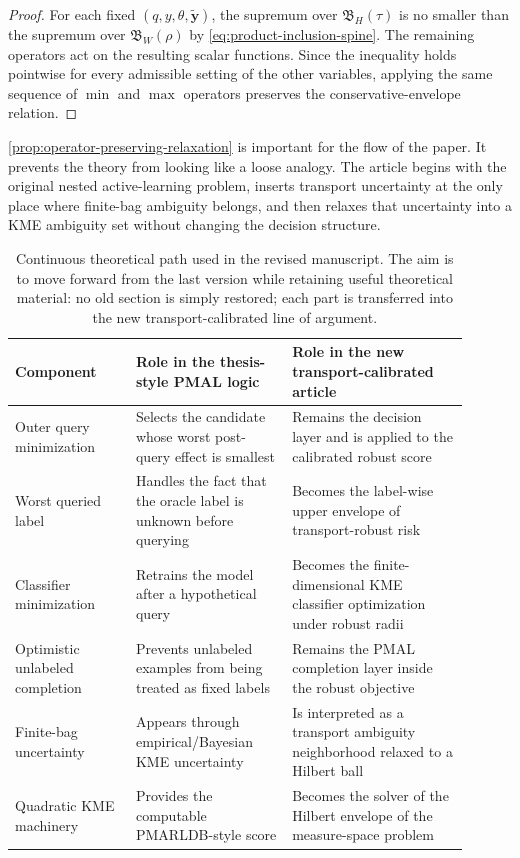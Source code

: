 \documentclass[10pt,journal]{IEEEtran}
\begin{document}
\begin{proof}
For each fixed $(q,y,\theta,\tilde{\mathbf y})$, the supremum over $\mathfrak B_H(\tau)$ is no smaller than the supremum over $\mathfrak B_W(\rho)$ by \eqref{eq:product-inclusion-spine}. The remaining operators act on the resulting scalar functions. Since the inequality holds pointwise for every admissible setting of the other variables, applying the same sequence of $\min$ and $\max$ operators preserves the conservative-envelope relation.
\end{proof}

\cref{prop:operator-preserving-relaxation} is important for the flow of the paper. It prevents the theory from looking like a loose analogy. The article begins with the original nested active-learning problem, inserts transport uncertainty at the only place where finite-bag ambiguity belongs, and then relaxes that uncertainty into a KME ambiguity set without changing the decision structure.

\begin{table}[t]
\centering
\caption{Continuous theoretical path used in the revised manuscript. The aim is to move forward from the last version while retaining useful theoretical material: no old section is simply restored; each part is transferred into the new transport-calibrated line of argument.}
\label{tab:forward-theory-map}
\small
\begin{tabular}{p{0.24\linewidth}p{0.31\linewidth}p{0.35\linewidth}}
\toprule
Component & Role in the thesis-style PMAL logic & Role in the new transport-calibrated article \\
\midrule
Outer query minimization & Selects the candidate whose worst post-query effect is smallest & Remains the decision layer and is applied to the calibrated robust score \\
Worst queried label & Handles the fact that the oracle label is unknown before querying & Becomes the label-wise upper envelope of transport-robust risk \\
Classifier minimization & Retrains the model after a hypothetical query & Becomes the finite-dimensional KME classifier optimization under robust radii \\
Optimistic unlabeled completion & Prevents unlabeled examples from being treated as fixed labels & Remains the PMAL completion layer inside the robust objective \\
Finite-bag uncertainty & Appears through empirical/Bayesian KME uncertainty & Is interpreted as a transport ambiguity neighborhood relaxed to a Hilbert ball \\
Quadratic KME machinery & Provides the computable PMARLDB-style score & Becomes the solver of the Hilbert envelope of the measure-space problem \\
\bottomrule
\end{tabular}
\end{table}
\end{document}
